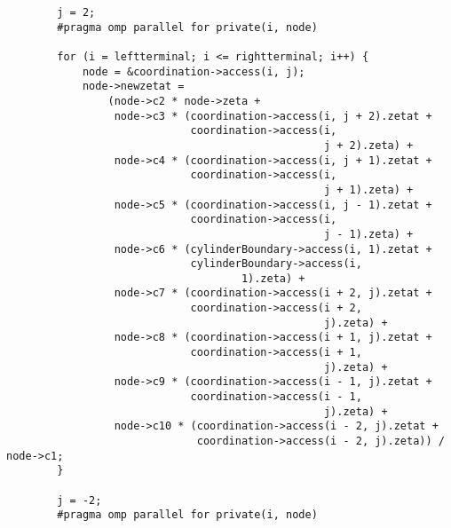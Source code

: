 \documentclass[12pt]{article}
\begin{document}
\begin{itemize}
\begin{lstlisting}
        j = 2;
        #pragma omp parallel for private(i, node)

        for (i = leftterminal; i <= rightterminal; i++) {
            node = &coordination->access(i, j);
            node->newzetat =
                (node->c2 * node->zeta +
                 node->c3 * (coordination->access(i, j + 2).zetat +
                             coordination->access(i,
                                                  j + 2).zeta) +
                 node->c4 * (coordination->access(i, j + 1).zetat +
                             coordination->access(i,
                                                  j + 1).zeta) +
                 node->c5 * (coordination->access(i, j - 1).zetat +
                             coordination->access(i,
                                                  j - 1).zeta) +
                 node->c6 * (cylinderBoundary->access(i, 1).zetat +
                             cylinderBoundary->access(i,
                                     1).zeta) +
                 node->c7 * (coordination->access(i + 2, j).zetat +
                             coordination->access(i + 2,
                                                  j).zeta) +
                 node->c8 * (coordination->access(i + 1, j).zetat +
                             coordination->access(i + 1,
                                                  j).zeta) +
                 node->c9 * (coordination->access(i - 1, j).zetat +
                             coordination->access(i - 1,
                                                  j).zeta) +
                 node->c10 * (coordination->access(i - 2, j).zetat +
                              coordination->access(i - 2, j).zeta)) / node->c1;
        }

        j = -2;
        #pragma omp parallel for private(i, node)


\end{lstlisting}
\end{itemize}
\end{document}
